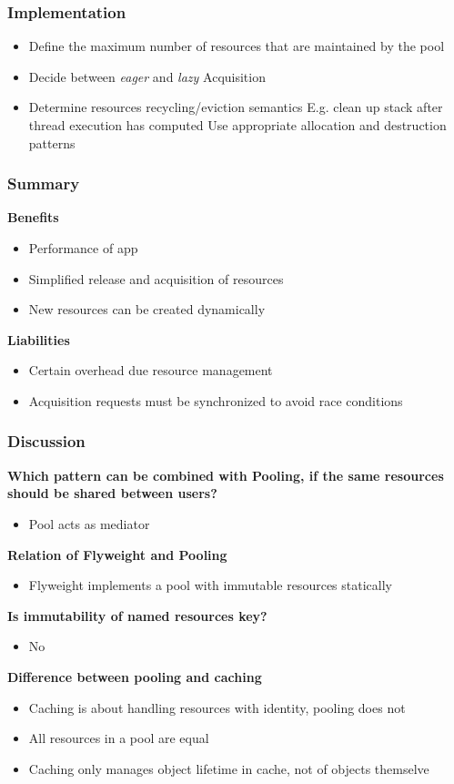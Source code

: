 \subsubsection{Implementation}
\begin{itemize}[topsep=0pt]
    \itemsep -0.4em
    \item Define the maximum number of resources that are maintained by the pool
    \item Decide between \textit{eager} and \textit{lazy} Acquisition
    \item Determine resources recycling/eviction semantics
        \SubItem E.g. clean up stack after thread execution has computed
        \SubItem Use appropriate allocation and destruction patterns
\end{itemize}
\subsubsection{Summary}
\textbf{Benefits}
\begin{itemize}[topsep=0pt]
    \itemsep -0.4em
    \item Performance of app
    \item Simplified release and acquisition of resources
    \item New resources can be created dynamically
\end{itemize}
\textbf{Liabilities}
\begin{itemize}[topsep=0pt]
    \itemsep -0.4em
    \item Certain overhead due resource management
    \item Acquisition requests must be synchronized to avoid race conditions
\end{itemize}
\subsubsection{Discussion}
\textbf{Which pattern can be combined with Pooling, if the same resources should be shared between users?}
\begin{itemize}[topsep=0pt]
    \itemsep -0.4em
    \item Pool acts as mediator
\end{itemize}
\textbf{Relation of Flyweight and Pooling}
\begin{itemize}[topsep=0pt]
    \itemsep -0.4em
    \item Flyweight implements a pool with immutable resources statically
\end{itemize}
\textbf{Is immutability of named resources key?}
\begin{itemize}[topsep=0pt]
    \itemsep -0.4em
    \item No
\end{itemize}
\textbf{Difference between pooling and caching}
\begin{itemize}[topsep=0pt]
    \itemsep -0.4em
    \item Caching is about handling resources with identity, pooling does not
    \item All resources in a pool are equal
    \item Caching only manages object lifetime in cache, not of objects themselve
\end{itemize}